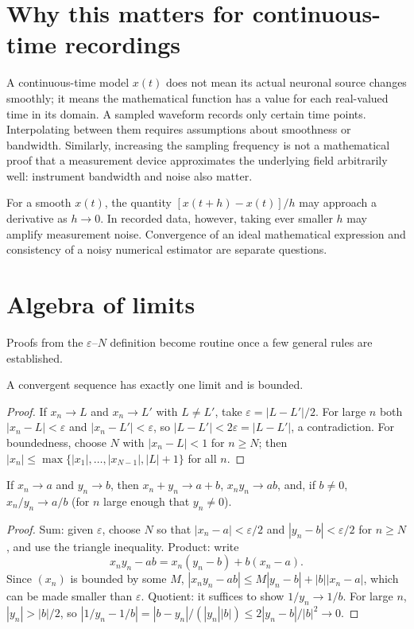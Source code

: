 \section{Why this matters for continuous-time recordings}
A continuous-time model $x(t)$ does not mean its actual neuronal source changes smoothly; it means the mathematical function has a value for each real-valued time in its domain. A sampled waveform records only certain time points. Interpolating between them requires assumptions about smoothness or bandwidth. Similarly, increasing the sampling frequency is not a mathematical proof that a measurement device approximates the underlying field arbitrarily well: instrument bandwidth and noise also matter.

\begin{workedexample}
For a smooth $x(t)$, the quantity $[x(t+h)-x(t)]/h$ may approach a derivative as $h\to0$. In recorded data, however, taking ever smaller $h$ may amplify measurement noise. Convergence of an ideal mathematical expression and consistency of a noisy numerical estimator are separate questions.
\end{workedexample}
\section{Algebra of limits}
Proofs from the $\varepsilon$--$N$ definition become routine once a few general rules are established.

\begin{proposition}
A convergent sequence has exactly one limit and is bounded.
\end{proposition}
\begin{proof}
If $x_n\to L$ and $x_n\to L'$ with $L\ne L'$, take $\varepsilon=|L-L'|/2$. For large $n$ both $|x_n-L|<\varepsilon$ and $|x_n-L'|<\varepsilon$, so $|L-L'|<2\varepsilon=|L-L'|$, a contradiction. For boundedness, choose $N$ with $|x_n-L|<1$ for $n\ge N$; then $|x_n|\le\max\{|x_1|,\ldots,|x_{N-1}|,|L|+1\}$ for all $n$.
\end{proof}

\begin{theorem}
If $x_n\to a$ and $y_n\to b$, then $x_n+y_n\to a+b$, $x_ny_n\to ab$, and, if $b\ne0$, $x_n/y_n\to a/b$ (for $n$ large enough that $y_n\ne0$).
\end{theorem}
\begin{proof}
Sum: given $\varepsilon$, choose $N$ so that $|x_n-a|<\varepsilon/2$ and $|y_n-b|<\varepsilon/2$ for $n\ge N$, and use the triangle inequality. Product: write
\[
x_ny_n-ab=x_n(y_n-b)+b(x_n-a).
\]
Since $(x_n)$ is bounded by some $M$, $|x_ny_n-ab|\le M|y_n-b|+|b||x_n-a|$, which can be made smaller than $\varepsilon$. Quotient: it suffices to show $1/y_n\to1/b$. For large $n$, $|y_n|>|b|/2$, so $|1/y_n-1/b|=|b-y_n|/(|y_n||b|)\le2|y_n-b|/|b|^2\to0$.
\end{proof}

